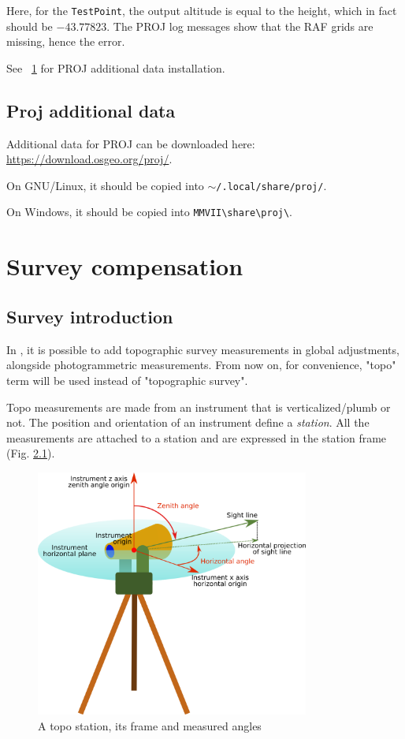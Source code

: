Here, for the \texttt{TestPoint}, the output altitude is equal to the height, which in fact should be $-43.77823$.
The PROJ log messages show that the RAF grids are missing, hence the error.

See ~\ref{ProjData} for PROJ additional data installation.


\section{Proj additional data}
\label{ProjData}
Additional data for PROJ can be downloaded here: \url{https://download.osgeo.org/proj/}.

On GNU/Linux, it should be copied into $\sim$\texttt{/.local/share/proj/}.

On Windows, it should be copied into \texttt{MMVII\textbackslash share\textbackslash proj\textbackslash}.




\chapter{Survey compensation}
\label{Chap:TopoUser}

\section{Survey introduction}

In \CdPPP, it is possible to add topographic survey measurements in global adjustments, alongside photogrammetric measurements. From now on, for convenience, "topo" term will be used instead of "topographic survey".

Topo measurements are made from an instrument that is verticalized/plumb or not.
The position and orientation of an instrument define a \textit{station}.
All the measurements are attached to a station and are expressed in the station frame (Fig. \ref{fig:topoStation}).

\begin{figure}[!h]
\centering
\includegraphics[width=9cm]{CommandReferences/ImagesComRef/topo.png}
\caption{A topo station, its frame and measured angles}
\label{fig:topoStation}
\end{figure}

